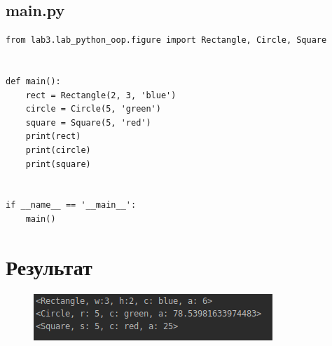 \documentclass{article}
\begin{document}
\subsection{main.py}
\begin{verbatim}
from lab3.lab_python_oop.figure import Rectangle, Circle, Square


def main():
    rect = Rectangle(2, 3, 'blue')
    circle = Circle(5, 'green')
    square = Square(5, 'red')
    print(rect)
    print(circle)
    print(square)


if __name__ == '__main__':
    main()

\end{verbatim}
\newpage
\section{Результат}
\begin{figure}[!h]
    \centering
    \includegraphics{result.png}
    \caption{}
    \label{}
\end{figure}
    
\end{document}

